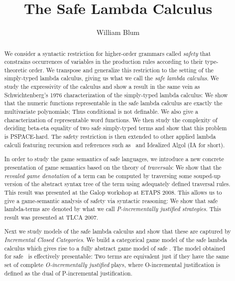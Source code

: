 \documentclass[11pt,a4paper,twoside,openright,draft]{myown}
\author{William Blum}
\title{The Safe Lambda Calculus}
\begin{document}
\maketitle

\begin{abstract}
We consider a syntactic restriction for higher-order grammars called \emph{safety}  that  constrains occurrences of variables in the production rules according to their type-theoretic order. We transpose and generalize this restriction to the setting of the simply-typed lambda calculus, giving us what we call the \emph{safe lambda calculus}.  We study the expressivity of the calculus and show a result in the same vein as Schwichtenberg's 1976 characterization of the simply-typed lambda calculus: We show that the numeric functions representable in the safe lambda calculus are exactly the multivariate polynomials; Thus conditional is not definable. We
also give a characterization of representable word functions.
We then study the complexity of deciding beta-eta equality of two safe simply-typed terms and show that this problem is PSPACE-hard. The safety restriction is then extended to other applied lambda calculi featuring recursion and references such as \pcf\ and Idealized Algol (IA for short).

In order to study the game semantics of safe languages, we introduce a new concrete presentation of game semantics based on the theory of \emph{traversals}: We show that the \emph{revealed game denotation} of a term can be computed by traversing some souped-up version of the abstract syntax tree of the term using adequately defined traversal rules. This result was presented at the Galop workshop at ETAPS 2008. This allows us to give a game-semantic analysis of safety via syntactic reasoning: We show that safe lambda-terms are denoted by what we call \emph{P-incrementally justified strategies}. This result was presented at TLCA 2007.

Next we study models of the safe lambda calculus and show that these are captured by  \emph{Incremental Closed Categories}. We build a categorical game model of the safe lambda calculus which gives rise to a fully abstract game model of safe \ialgol.
The model obtained for safe \ialgol\ is effectively presentable: Two terms are equivalent just if they have the same set of complete \emph{O-incrementally justified} plays, where O-incremental justification is defined as the dual of P-incremental justification.


\end{abstract}
\end{document}
